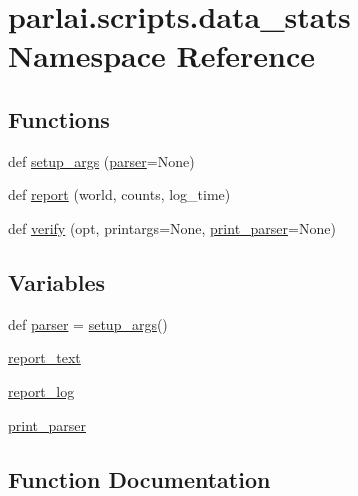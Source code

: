 \hypertarget{namespaceparlai_1_1scripts_1_1data__stats}{}\section{parlai.\+scripts.\+data\+\_\+stats Namespace Reference}
\label{namespaceparlai_1_1scripts_1_1data__stats}
\subsection*{Functions}
\begin{DoxyCompactItemize}
\item 
def \hyperlink{namespaceparlai_1_1scripts_1_1data__stats_add47fb96d75895f4c21d9e310cb1df40}{setup\+\_\+args} (\hyperlink{namespaceparlai_1_1scripts_1_1data__stats_af1cc1fdf5289b1dfc8277f9de43ff109}{parser}=None)
\item 
def \hyperlink{namespaceparlai_1_1scripts_1_1data__stats_a8cc2308cc735ce6cf029d4c02fea5a21}{report} (world, counts, log\+\_\+time)
\item 
def \hyperlink{namespaceparlai_1_1scripts_1_1data__stats_a3bf0a490abe0b6ea608d1f9ece194c79}{verify} (opt, printargs=None, \hyperlink{namespaceparlai_1_1scripts_1_1data__stats_a89286b21a94125aadf5cc8571abe3f7f}{print\+\_\+parser}=None)
\end{DoxyCompactItemize}
\subsection*{Variables}
\begin{DoxyCompactItemize}
\item 
def \hyperlink{namespaceparlai_1_1scripts_1_1data__stats_af1cc1fdf5289b1dfc8277f9de43ff109}{parser} = \hyperlink{namespaceparlai_1_1scripts_1_1data__stats_add47fb96d75895f4c21d9e310cb1df40}{setup\+\_\+args}()
\item 
\hyperlink{namespaceparlai_1_1scripts_1_1data__stats_a63e65c276e15211e573af8db9cfb9dbf}{report\+\_\+text}
\item 
\hyperlink{namespaceparlai_1_1scripts_1_1data__stats_a08ce833d7c44ab350dfd93f9ae09b614}{report\+\_\+log}
\item 
\hyperlink{namespaceparlai_1_1scripts_1_1data__stats_a89286b21a94125aadf5cc8571abe3f7f}{print\+\_\+parser}
\end{DoxyCompactItemize}


\subsection{Function Documentation}
\mbox{\label{namespaceparlai_1_1scripts_1_1data__stats_a8cc2308cc735ce6cf029d4c02fea5a21}} 

